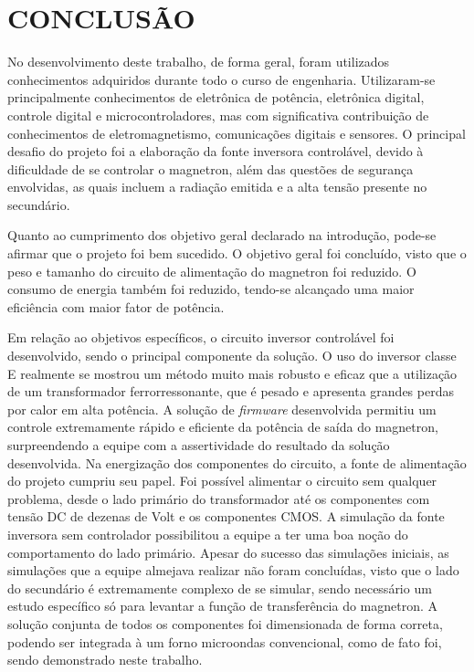 \chapter{CONCLUSÃO}
\label{chap:conclusao}


No desenvolvimento deste trabalho, de forma geral, foram utilizados conhecimentos adquiridos durante todo o curso de engenharia. Utilizaram-se principalmente conhecimentos de eletrônica de potência, eletrônica digital, controle digital e microcontroladores, mas com significativa contribuição de conhecimentos de eletromagnetismo, comunicações digitais e  sensores. O principal desafio do projeto foi a elaboração da fonte inversora controlável, devido à dificuldade de se controlar o magnetron, além das questões de segurança envolvidas, as quais incluem a radiação emitida e a alta tensão presente no secundário.

Quanto ao cumprimento dos objetivo geral declarado na introdução, pode-se afirmar que o projeto foi bem sucedido. O objetivo geral foi concluído, visto que o peso e tamanho do circuito de alimentação do magnetron foi reduzido. O consumo de energia também foi reduzido, tendo-se alcançado uma maior eficiência com maior fator de potência. 

Em relação ao objetivos específicos, o circuito inversor controlável foi desenvolvido, sendo o principal componente da solução. O uso do inversor classe E realmente se mostrou um método muito mais robusto e eficaz que a utilização de um transformador ferrorressonante, que é pesado e apresenta grandes perdas por calor em alta potência. A solução de \textit{firmware} desenvolvida  permitiu um controle extremamente rápido e eficiente da potência de saída do magnetron, surpreendendo a equipe com a assertividade do resultado da solução desenvolvida. Na energização dos componentes do circuito, a fonte de alimentação do projeto cumpriu seu papel. Foi possível alimentar o circuito sem qualquer problema, desde o lado primário do transformador até os componentes com tensão DC de dezenas de Volt e os componentes CMOS. A simulação da fonte inversora sem controlador possibilitou a equipe a ter uma boa noção do comportamento do lado primário. Apesar do sucesso das simulações iniciais, as simulações que a equipe almejava realizar não foram concluídas, visto que o lado do secundário é extremamente complexo de se simular, sendo necessário um estudo específico só para levantar a função de transferência do magnetron. A solução conjunta de todos os componentes foi dimensionada de forma correta, podendo ser integrada à um forno microondas convencional, como de fato foi, sendo demonstrado neste trabalho.

